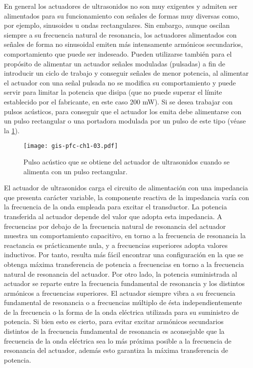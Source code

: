 En general los actuadores de ultrasonidos no son muy exigentes y admiten
ser alimentados para su funcionamiento con señales de formas muy diversas
como, por ejemplo, sinusoides u ondas rectangulares. Sin embargo, aunque
oscilan siempre a su frecuencia natural de resonancia, los actuadores
alimentados con señales de forma no sinusoidal emiten más intensamente
armónicos secundarios, comportamiento que puede ser indeseado. Pueden
utilizarse también para el propósito de alimentar un actuador señales
moduladas (pulsadas) a fin de introducir un ciclo de trabajo y conseguir
señales de menor potencia, al alimentar el actuador con una señal pulsada
no se modifica su comportamiento y puede servir para limitar la potencia
que disipa (que no puede superar el límite establecido por el fabricante,
en este caso 200 mW). Si se desea trabajar con pulsos acústicos, para
conseguir que el actuador los emita debe alimentarse con un pulso
rectangular o una portadora modulada por un pulso de este tipo (véase la
\cref{fig:pulse}).

\sshortpage{}

\begin{figure}
	\begin{center}
		\texttt{[image: gis-pfc-ch1-03.pdf]}
	\end{center}
	\caption[Pulso acústico generado por el actuador de
	ultrasonidos]{Pulso acústico que se obtiene del actuador de
	ultrasonidos cuando se alimenta con un pulso rectangular.}
	\label{fig:pulse}
\end{figure}

El actuador de ultrasonidos carga el circuito de alimentación con una
impedancia que presenta carácter variable, la componente reactiva de la
impedancia varía con la frecuencia de la onda empleada para excitar el
transductor. La potencia transferida al actuador depende del valor que
adopta esta impedancia. A frecuencias por debajo de la frecuencia natural
de resonancia del actuador muestra un comportamiento capacitivo, en torno a
la frecuencia de resonancia la reactancia es prácticamente nula, y a
frecuencias superiores adopta valores inductivos. Por tanto, resulta más
fácil encontrar una configuración en la que se obtenga máxima transferencia
de potencia a frecuencias en torno a la frecuencia natural de resonancia
del actuador. Por otro lado, la potencia suministrada al actuador se
reparte entre la frecuencia fundamental de resonancia y los distintos
armónicos a frecuencias superiores. El actuador siempre vibra a su
frecuencia fundamental de resonancia o a frecuencias múltiplo de ésta
independientemente de la frecuencia o la forma de la onda eléctrica
utilizada para su suministro de potencia. Si bien esto es cierto, para
evitar excitar armónicos secundarios distintos de la frecuencia fundamental
de resonancia es aconsejable que la frecuencia de la onda eléctrica sea lo
más próxima posible a la frecuencia de resonancia del actuador, además esto
garantiza la máxima transferencia de potencia.

